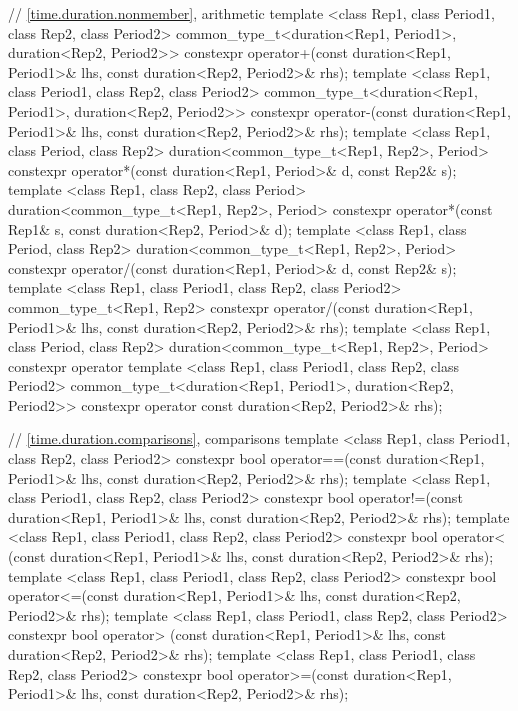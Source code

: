 \begin{codeblock}
{{    // \ref{time.duration.nonmember},  arithmetic
    template <class Rep1, class Period1, class Rep2, class Period2>
      common_type_t<duration<Rep1, Period1>, duration<Rep2, Period2>>
      constexpr operator+(const duration<Rep1, Period1>& lhs,
                          const duration<Rep2, Period2>& rhs);
    template <class Rep1, class Period1, class Rep2, class Period2>
      common_type_t<duration<Rep1, Period1>, duration<Rep2, Period2>>
      constexpr operator-(const duration<Rep1, Period1>& lhs,
                          const duration<Rep2, Period2>& rhs);
    template <class Rep1, class Period, class Rep2>
      duration<common_type_t<Rep1, Rep2>, Period>
      constexpr operator*(const duration<Rep1, Period>& d, const Rep2& s);
    template <class Rep1, class Rep2, class Period>
      duration<common_type_t<Rep1, Rep2>, Period>
      constexpr operator*(const Rep1& s, const duration<Rep2, Period>& d);
    template <class Rep1, class Period, class Rep2>
      duration<common_type_t<Rep1, Rep2>, Period>
      constexpr operator/(const duration<Rep1, Period>& d, const Rep2& s);
    template <class Rep1, class Period1, class Rep2, class Period2>
      common_type_t<Rep1, Rep2>
      constexpr operator/(const duration<Rep1, Period1>& lhs,
                          const duration<Rep2, Period2>& rhs);
    template <class Rep1, class Period, class Rep2>
      duration<common_type_t<Rep1, Rep2>, Period>
      constexpr operator%
    template <class Rep1, class Period1, class Rep2, class Period2>
      common_type_t<duration<Rep1, Period1>, duration<Rep2, Period2>>
      constexpr operator%
                          const duration<Rep2, Period2>& rhs);

    // \ref{time.duration.comparisons},  comparisons
    template <class Rep1, class Period1, class Rep2, class Period2>
      constexpr bool operator==(const duration<Rep1, Period1>& lhs,
                                const duration<Rep2, Period2>& rhs);
    template <class Rep1, class Period1, class Rep2, class Period2>
      constexpr bool operator!=(const duration<Rep1, Period1>& lhs,
                                const duration<Rep2, Period2>& rhs);
    template <class Rep1, class Period1, class Rep2, class Period2>
      constexpr bool operator< (const duration<Rep1, Period1>& lhs,
                                const duration<Rep2, Period2>& rhs);
    template <class Rep1, class Period1, class Rep2, class Period2>
      constexpr bool operator<=(const duration<Rep1, Period1>& lhs,
                                const duration<Rep2, Period2>& rhs);
    template <class Rep1, class Period1, class Rep2, class Period2>
      constexpr bool operator> (const duration<Rep1, Period1>& lhs,
                                const duration<Rep2, Period2>& rhs);
    template <class Rep1, class Period1, class Rep2, class Period2>
      constexpr bool operator>=(const duration<Rep1, Period1>& lhs,
                                const duration<Rep2, Period2>& rhs);

}}
\end{codeblock}
